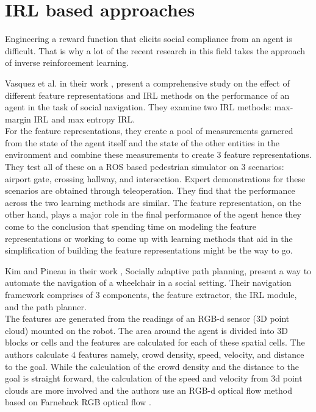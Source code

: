 \section{IRL based approaches}
Engineering a reward function that elicits social compliance from an agent is difficult. That is why a lot of the recent research in this field takes the approach of inverse reinforcement learning. \par 
Vasquez et al. in their work \cite{vasquez_inverse_2014}, present a comprehensive study on the effect of different feature representations and IRL methods on the performance of an agent in the task of social navigation. They examine two IRL methods: max-margin IRL and max entropy IRL.\\
For the feature representations, they create a pool of measurements garnered from the state of the agent itself and the state of the other entities in the environment and combine these measurements to create 3 feature representations. \\
They test all of these on a ROS based pedestrian simulator on 3 scenarios: airport gate, crossing hallway, and intersection. Expert demonstrations for these scenarios are obtained through teleoperation. They find that the performance across the two learning methods are similar. The feature representation, on the other hand, plays a major role in the final performance of the agent hence they come to the conclusion that spending time on modeling the feature representations or working to come up with learning methods that aid in the simplification of building the feature representations might be the way to go.
\\
\par
Kim and Pineau in their work \cite{kim_socially_2016}, Socially adaptive path planning, present a way to automate the navigation of a wheelchair in a social setting. Their navigation framework comprises of 3 components, the feature extractor, the IRL module, and the path planner.\\
The features are generated from the readings of an RGB-d sensor ($3$D point cloud) mounted on the robot. The area around the agent is divided into $3$D blocks or cells and the features are calculated for each of these spatial cells. 
The authors calculate $4$ features namely,
crowd density, speed, velocity, and distance to the goal.
While the calculation of the crowd density and the distance to the goal is straight forward, the calculation of the speed and velocity from 3d point clouds are more involved and the authors use an RGB-d optical flow method based on Farneback RGB optical flow \cite{farneback_optical_flow}. 
